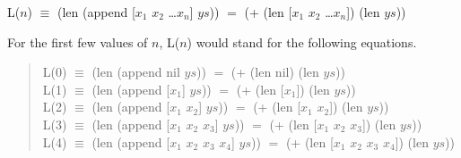 \label{additive-concat-law-predicate}
\begin{center}
L($n$) $\equiv$ (len (append [$x_1$ $x_2$ \dots $x_n$] $ys$)) $=$ (+ (len [$x_1$ $x_2$ \dots $x_n$]) (len $ys$))
\end{center}

For the first few values of $n$, L($n$) would stand for the following equations.
\begin{quote}
L(0) $\equiv$ (len (append nil $ys$)) $=$ (+ (len nil) (len $ys$)) \\
L(1) $\equiv$ (len (append [$x_1$] $ys$)) $=$ (+ (len [$x_1$]) (len $ys$)) \\
L(2) $\equiv$ (len (append [$x_1$ $x_2$] $ys$)) $=$ (+ (len [$x_1$ $x_2$]) (len $ys$)) \\
L(3) $\equiv$ (len (append [$x_1$ $x_2$ $x_3$] $ys$)) $=$ (+ (len [$x_1$ $x_2$ $x_3$]) (len $ys$)) \\
L(4) $\equiv$ (len (append [$x_1$ $x_2$ $x_3$ $x_4$] $ys$)) $=$ (+ (len [$x_1$ $x_2$ $x_3$ $x_4$]) (len $ys$))
\end{quote}


